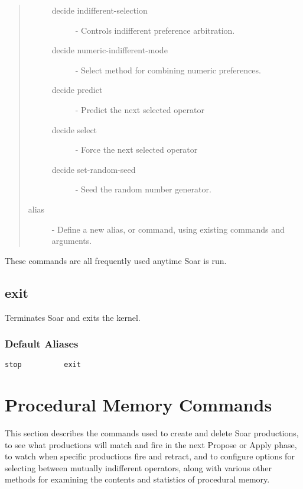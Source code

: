 \begin{quote}
\begin{description}
		\begin{description}
			\item[decide indifferent-selection] -  Controls indifferent preference arbitration.
			\item[decide numeric-indifferent-mode] - Select method for combining numeric preferences.
			\item[decide predict] - Predict the next selected operator
			\item[decide select] - Force the next selected operator
			\item[decide set-random-seed] - Seed the random number generator.
		\end{description}
		\item[alias] - Define a new alias, or command, using existing commands and arguments.
	\end{description}
\end{quote}

These commands are all frequently used anytime Soar is run.

\divider


\divider


\divider
\subsection{exit}\label{exit}
Terminates Soar and exits the kernel.
\subsubsection{Default Aliases}
\verb|stop          exit|

\divider


\divider


\divider


\divider


\section{Procedural Memory Commands}
\label{INTERFACE-procedural-memory}

This section describes the commands used to create and delete Soar productions, to see what productions will match and fire in the next Propose or Apply phase, to watch when specific productions fire and retract, and to configure options for selecting between mutually indifferent operators, along with various other methods for examining the contents and statistics of procedural memory.

